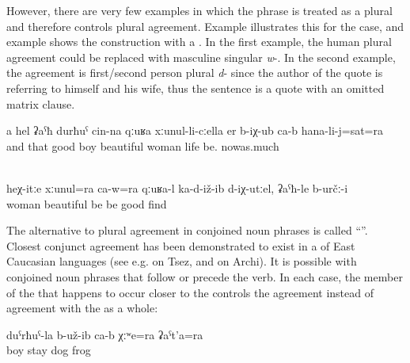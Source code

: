However, there are very few examples in which the  phrase is treated as a plural  and therefore controls plural agreement. Example  illustrates this for the  case, and example  shows the  construction with a . In the first example, the human plural agreement could be replaced with masculine singular \textit{w}-. In the second example, the agreement is first/second person plural \textit{d}- since the author of the quote is referring to himself and his wife, thus the sentence is a quote with an omitted matrix clause.
%
\begin{exe}
	\ex	\label{ex:‎The good boy with this beautiful wife lived until now}
	\gll	a	hel	ʡaˁħ	durħuˁ	cin-na	qːuʁa	xːunul-li-cːella er b-iχ-ub ca-b hana-li-j=sat=ra\\
		and	that	good	boy		beautiful	woman	life	be.		nowas.much\\
	\glt	{}

	\\	\label{ex:If he would sit together with his wife well like this, this would be good}
	\gll	heχ-itːe xːunul=ra	ca-w=ra	qːuʁa-l	ka-d-iž-ib	d-iχ-utːel,	ʡaˁħ-le	b-určː-i\\
			woman		beautiful	be	be	good	find\\
	\glt	{}
\end{exe}

The alternative to plural agreement in conjoined noun phrases is called ``''. Closest conjunct agreement has been demonstrated to exist in a  of East Caucasian languages (see e.g. \citealp{Polinsky.etal2009} on Tsez, and \citealp{Chumakina2014} on Archi). It is possible with conjoined noun phrases that follow or precede the verb. In each case, the member of the  that happens to occur closer to the  controls the agreement instead of agreement with the  as a whole:
%
\begin{exe}
	\ex	\label{ex:‎The boy had a dog and a frog}
	\gll	duˁrħuˁ-la	b-už-ib	ca-b	χːʷe=ra	ʡaˁt'a=ra\\
		boy	stay		dog\tsc{=add}	frog\\
	\glt	{}
\end{exe}

